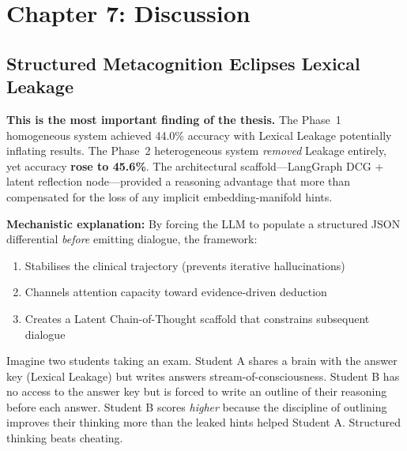 \section{Chapter 7: Discussion}
\label{ch:discussion}

\subsection{Structured Metacognition Eclipses Lexical Leakage}

\begin{acadbox}[\textcolor{white}{Academic Definition}]
\textbf{This is the most important finding of the thesis.} The Phase~1 homogeneous system achieved 44.0\% accuracy with Lexical Leakage potentially inflating results. The Phase~2 heterogeneous system \textit{removed} Leakage entirely, yet accuracy \textbf{rose to 45.6\%}. The architectural scaffold---LangGraph DCG + latent reflection node---provided a reasoning advantage that more than compensated for the loss of any implicit embedding-manifold hints.

\textbf{Mechanistic explanation:} By forcing the LLM to populate a structured JSON differential \textit{before} emitting dialogue, the framework:
\begin{enumerate}
    \item Stabilises the clinical trajectory (prevents iterative hallucinations)
    \item Channels attention capacity toward evidence-driven deduction
    \item Creates a Latent Chain-of-Thought scaffold that constrains subsequent dialogue
\end{enumerate}
\end{acadbox}

\begin{analogybox}[\textcolor{white}{Simple Analogy}]
Imagine two students taking an exam. Student A shares a brain with the answer key (Lexical Leakage) but writes answers stream-of-consciousness. Student B has no access to the answer key but is forced to write an outline of their reasoning before each answer. Student B scores \textit{higher} because the discipline of outlining improves their thinking more than the leaked hints helped Student A. Structured thinking beats cheating.
\end{analogybox}

